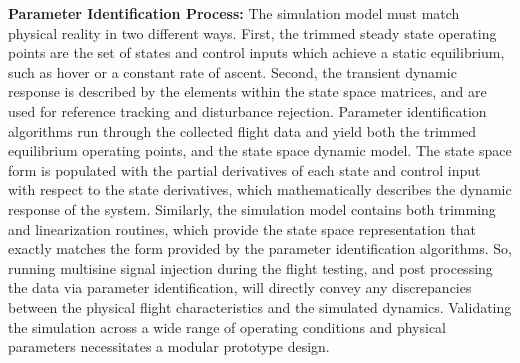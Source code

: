 \documentclass[11pt]{article}
\begin{document}
{\bf Parameter Identification Process:}
The simulation model must match physical reality in two different ways.  First, the trimmed steady state operating points are the set of states and control inputs which achieve a static equilibrium, such as hover or a constant rate of ascent.  Second, the transient dynamic response is described by the elements within the state space matrices, and are used for reference tracking and disturbance rejection.  Parameter identification algorithms run through the collected flight data and yield both the trimmed equilibrium operating points, and the state space dynamic model.  The state space form is populated with the partial derivatives of each state and control input with respect to the state derivatives, which mathematically describes the dynamic response of the system.  Similarly, the simulation model contains both trimming and linearization routines, which provide the state space representation that exactly matches the form provided by the parameter identification algorithms.  So, running multisine signal injection during the flight testing, and post processing the data via parameter identification, will directly convey any discrepancies between the physical flight characteristics and the simulated dynamics.  Validating the simulation across a wide range of operating conditions and physical parameters necessitates a modular prototype design.
\end{document}
